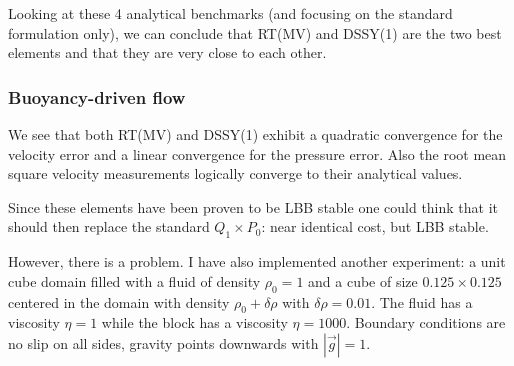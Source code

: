 Looking at these 4 analytical benchmarks (and focusing on the standard formulation only), 
we can conclude that RT(MV) and DSSY(1) are the two best elements and that they are very close to 
each other.



\subsubsection*{Buoyancy-driven flow}

We see that both RT(MV) and DSSY(1) exhibit a quadratic convergence for the
velocity error and a linear convergence for the pressure error. Also the root mean square 
velocity measurements logically converge to their analytical values.  

Since these elements have been proven to be LBB stable one could think that it 
should then replace the standard $Q_1 \times P_0$: near identical cost, but LBB stable.

However, there is  a problem. I have also implemented another experiment: a unit cube domain
filled with a fluid of density $\rho_0=1$ and a cube of size $0.125\times 0.125$ centered in the domain
with density $\rho_0+\delta \rho$ with $\delta\rho=0.01$. The fluid has a viscosity $\eta=1$ while the 
block has a viscosity $\eta=1000$.
Boundary conditions are no slip on all sides, gravity points downwards with $|\vec{g}|=1$.

